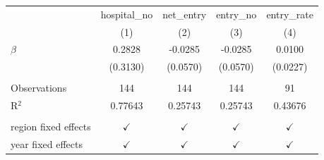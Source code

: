 \begingroup
\centering
\begin{tabular}{lcccc}
   \toprule
                        & hospital\_no  & net\_entry    & entry\_no     & entry\_rate\\   
                        & (1)           & (2)           & (3)           & (4)\\  
   \midrule 
   $\beta$              & 0.2828        & -0.0285       & -0.0285       & 0.0100\\   
                        & (0.3130)      & (0.0570)      & (0.0570)      & (0.0227)\\   
    \\
   Observations         & 144           & 144           & 144           & 91\\  
   R$^2$                & 0.77643       & 0.25743       & 0.25743       & 0.43676\\  
    \\
   region fixed effects & $\checkmark$  & $\checkmark$  & $\checkmark$  & $\checkmark$\\   
   year fixed effects   & $\checkmark$  & $\checkmark$  & $\checkmark$  & $\checkmark$\\   
   \bottomrule
\end{tabular}
\par\endgroup

